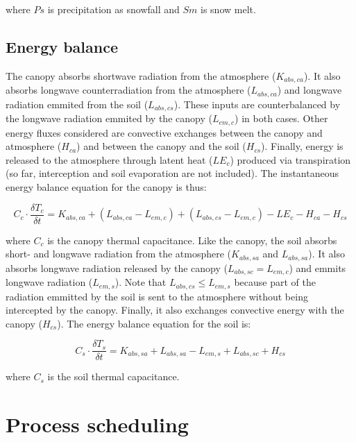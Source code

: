 \documentclass[]{book}
\begin{document}
where \(Ps\) is precipitation as snowfall and \(Sm\) is snow melt.

\subsection{Energy balance}\label{energy-balance}

The canopy absorbs shortwave radiation from the atmosphere
(\(K_{abs,ca}\)). It also absorbs longwave counterradiation from the
atmosphere (\(L_{abs,ca}\)) and longwave radiation emmited from the soil
(\(L_{abs,cs}\)). These inputs are counterbalanced by the longwave
radiation emmited by the canopy (\(L_{em,c}\)) in both cases. Other
energy fluxes considered are convective exchanges between the canopy and
atmosphere (\(H_{ca}\)) and between the canopy and the soil
(\(H_{cs}\)). Finally, energy is released to the atmosphere through
latent heat (\(LE_{c}\)) produced via transpiration (so far,
interception and soil evaporation are not included). The instantaneous
energy balance equation for the canopy is thus:

\begin{equation}
  C_{c} \cdot \frac{\delta T_{c}}{\delta t} = K_{abs,ca} + (L_{abs,ca} - L_{em,c}) + (L_{abs,cs} - L_{em,c}) - LE_{c} - H_{ca} - H_{cs} 
\end{equation}

where \(C_{c}\) is the canopy thermal capacitance. Like the canopy, the
soil absorbs short- and longwave radiation from the atmosphere
(\(K_{abs,sa}\) and \(L_{abs,sa}\)). It also absorbs longwave radiation
released by the canopy (\(L_{abs,sc} = L_{em,c}\)) and emmits longwave
radiation (\(L_{em,s}\)). Note that \(L_{abs,cs} \leq L_{em,s}\) because
part of the radiation emmitted by the soil is sent to the atmosphere
without being intercepted by the canopy. Finally, it also exchanges
convective energy with the canopy (\(H_{cs}\)). The energy balance
equation for the soil is:

\begin{equation}
  C_{s} \cdot \frac{\delta T_{s}}{\delta t} = K_{abs,sa} + L_{abs,sa} - L_{em,s} + L_{abs,sc} + H_{cs} 
\end{equation}

where \(C_{s}\) is the soil thermal capacitance.

\section{Process scheduling}\label{process-scheduling-1}
\end{document}
